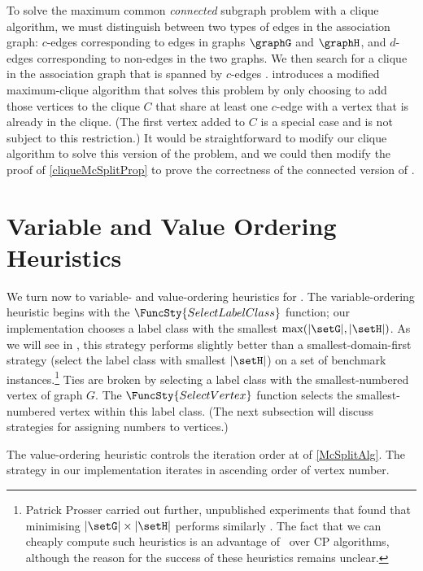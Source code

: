 To solve the maximum common \emph{connected} subgraph problem with a clique algorithm,
we must distinguish between two types of edges in the association graph: $c$-edges
corresponding to edges in graphs $\graphG$ and $\graphH$, and $d$-edges corresponding
to non-edges in the two graphs.  We then search for a clique in the association graph
that is spanned by $c$-edges
\citep{DBLP:journals/tcs/Koch01,DBLP:conf/mco/VismaraV08}.
\citet{DBLP:conf/cp/McCreeshNPS16} introduces a modified maximum-clique algorithm
that solves this problem by only choosing to add those vertices to the clique $C$ that
share at least one $c$-edge with a vertex that is already in the clique.  (The first
vertex added to $C$ is a special case and is not subject to this restriction.)
It would be straightforward to modify our clique algorithm to solve this version of the
problem, and we could then modify the proof of \cref{cliqueMcSplitProp} to prove the
correctness of the connected version of \McSplit.

\FloatBarrier

\section{Variable and Value Ordering Heuristics}\label{sec:mcsplit-heuristics}

We turn now to variable- and value-ordering heuristics for \McSplit.
The variable-ordering heuristic begins with the $\FuncSty{SelectLabelClass}$
function; our implementation chooses a label class with the smallest
$\max(|\setG|,|\setH|)$. As we will see in 
, this strategy performs slightly
better than a smallest-domain-first strategy (select the label class
with smallest $|\setH|$) on a set of benchmark instances.\footnote{Patrick
Prosser carried out further, unpublished experiments
that found that minimising $|\setG|\times|\setH|$ performs similarly
\citep{Prosser2017McSplitHeuristics}. The fact that we can cheaply compute
such heuristics is an advantage of \McSplit\ over CP algorithms, although
the reason for the success of these heuristics remains unclear.}
Ties are broken by selecting a label class with the smallest-numbered
vertex of graph $G$.
The $\FuncSty{SelectVertex}$ function selects the smallest-numbered vertex
within this label class. (The next subsection will discuss strategies
for assigning numbers to vertices.)

The value-ordering heuristic controls the iteration
order at  of \cref{McSplitAlg}. The strategy
in our implementation iterates in ascending order of vertex number.

